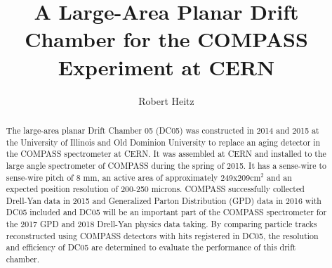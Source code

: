 \documentclass[aps,prl,twocolumn,groupedaddress]{revtex4-1}
\begin{document}

\title{A Large-Area Planar Drift Chamber for the COMPASS Experiment at CERN}


\author{Robert Heitz}



\begin{abstract}
The large-area planar Drift Chamber 05 (DC05) was constructed in 2014 and 2015
at the University of Illinois and Old Dominion University to replace an aging
detector in the COMPASS spectrometer at CERN.  It was assembled at CERN and
installed to the large angle spectrometer of COMPASS during the spring of 2015.
It has a sense-wire to sense-wire pitch of 8 mm, an active area of
approximately 249x209cm$^2$ and an expected position resolution of 200-250
microns.  COMPASS successfully collected Drell-Yan data in 2015 and Generalized
Parton Distribution (GPD) data in 2016 with DC05 included and DC05 will be an
important part of the COMPASS spectrometer for the 2017 GPD and 2018 Drell-Yan
physics data taking.  By comparing particle tracks reconstructed using COMPASS
detectors with hits registered in DC05, the resolution and efficiency of DC05
are determined to evaluate the performance of this drift chamber.
\end{abstract}
\end{document}
